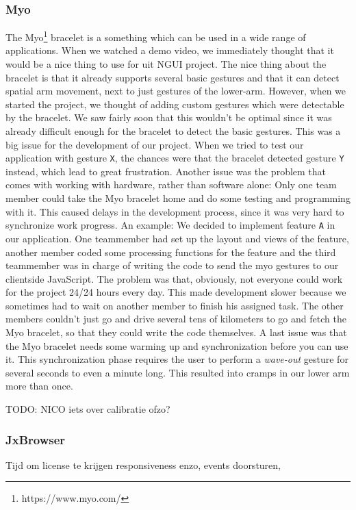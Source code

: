 \documentclass{article}
\begin{document}
\subsubsection{Myo}
The Myo\footnote{https://www.myo.com/} bracelet is a something which can be used in a wide range of applications. When we watched a demo video, we immediately thought that it would be a nice thing to use for uit NGUI project. The nice thing about the bracelet is that it already supports several basic gestures and that it can detect spatial arm movement, next to just gestures of the lower-arm. However, when we started the project, we thought of adding custom gestures which were detectable by the bracelet. We saw fairly soon that this wouldn't be optimal since it was already difficult enough for the bracelet to detect the basic gestures. This was a big issue for the development of our project. When we tried to test our application with gesture \texttt{X}, the chances were that the bracelet detected gesture \texttt{Y} instead, which lead to great frustration.
Another issue was the problem that comes with working with hardware, rather than software alone: Only one team member could take the Myo bracelet home and do some testing and programming with it. This caused delays in the development process, since it was very hard to synchronize work progress. An example: We decided to implement feature \texttt{A} in our application. One teammember had set up the layout and views of the feature, another member coded some processing functions for the feature and the third teammember was in charge of writing the code to send the myo gestures to our clientside JavaScript. The problem was that, obviously, not everyone could work for the project 24/24 hours every day. This made development slower because we sometimes had to wait on another member to finish his assigned task. The other members couldn't just go and drive several tens of kilometers to go and fetch the Myo bracelet, so that they could write the code themselves.
A last issue was that the Myo bracelet needs some warming up and synchronization before you can use it. This synchronization phase requires the user to perform a \textit{wave-out} gesture for several seconds to even a minute long. This resulted into cramps in our lower arm more than once.

TODO: NICO iets over calibratie ofzo?


\subsubsection{JxBrowser}
Tijd om license te krijgen
responsiveness enzo, events doorsturen,
\end{document}
